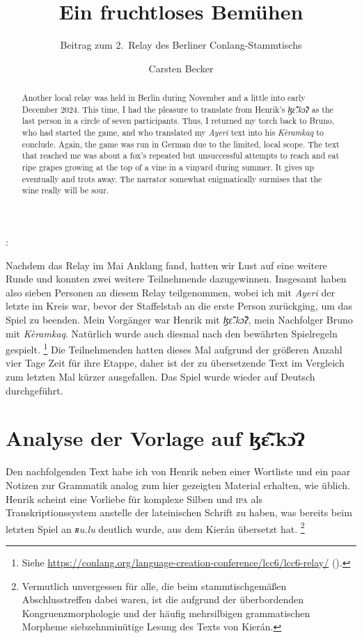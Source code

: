 \documentclass[
	12pt,
	ngerman,
]{scrartcl}
\author{Carsten Becker}
\title{Ein fruchtloses Bemühen}
\subtitle{Beitrag zum 2.~Relay des Berliner Conlang-Stammtischs}
\date{\DTMdate{2024-12-00}} %
\newcommand{\fw}[1]{\textit{#1}} %
\newenvironment{mytitle}{
	\hfill
	\begin{minipage}{0.667\textwidth}
	\vspace{\baselineskip}
	\begin{center}
		\Large
		\sffamily\bfseries
		\makeatletter
}{
		\makeatother
	\end{center}
	\vspace{1em}
	\end{minipage}
	\hfill
}
\newcommand{\Lhengko}{ɮɛ̃̂.kɔ̌ʔ}
\begin{document}

\begin{mytitle}
	\@title: \@subtitle
\end{mytitle}

\begin{abstract}
Another local relay was held in Berlin during November and a little into early
December 2024. This time, I had the pleasure to translate from Henrik's
\emph{\Lhengko} as the last person in a circle of seven participants. Thus, I
returned my torch back to Bruno, who had started the game, and who translated
my \emph{Ayeri} text into his \emph{Kèramkaq} to conclude. Again, the game was
run in German due to the limited, local scope. The text that reached me was
about a fox's repeated but unsuccessful attempts to reach and eat ripe grapes
growing at the top of a vine in a vinyard during summer. It gives up eventually
and trots away. The narrator somewhat enigmatically surmises that the wine
really will be sour.
\end{abstract}

Nachdem das Relay im Mai Anklang fand, hatten wir Lust auf eine weitere Runde
und konnten zwei weitere Teilnehmende dazugewinnen. Insgesamt haben also sieben
Personen an diesem Relay teilgenommen, wobei ich mit \emph{Ayeri} der letzte im
Kreis war, bevor der Staffelstab an die erste Person zurückging, um das Spiel
zu beenden. Mein Vorgänger war Henrik mit \emph{\Lhengko}, mein Nachfolger
Bruno mit \emph{Kèramkaq}. Natürlich wurde auch diesmal nach den bewährten
Spielregeln gespielt.%
%
	\footnote{Siehe
	\url{https://conlang.org/language-creation-conference/lcc6/lcc6-relay/}
	().}
%
Die Teilnehmenden hatten dieses Mal aufgrund der größeren Anzahl vier Tage Zeit
für ihre Etappe, daher ist der zu übersetzende Text im Vergleich zum letzten
Mal kürzer ausgefallen. Das Spiel wurde wieder auf Deutsch durchgeführt.


\section{Analyse der Vorlage auf \Lhengko}
\label{sec:lhenganalys}

Den nachfolgenden Text habe ich von Henrik neben einer Wortliste und ein paar
Notizen zur Grammatik analog zum hier gezeigten Material erhalten, wie üblich.
Henrik scheint eine Vorliebe für komplexe Silben und \textsc{ipa} als
Transkriptionssystem anstelle der lateinischen Schrift zu haben, was bereits
beim letzten Spiel an \fw{ʀu.lu} deutlich wurde, aus dem Kierán übersetzt hat.%
%
	\footnote{Vermutlich unvergessen für alle, die beim stammtischgemäßen
	Abschlusstreffen dabei waren, ist die aufgrund der überbordenden
	Kongruenzmorphologie und der häufig mehrsilbigen grammatischen Morpheme
	siebzehn\-minütige Lesung des Texts von Kierán.}
%
\end{document}
